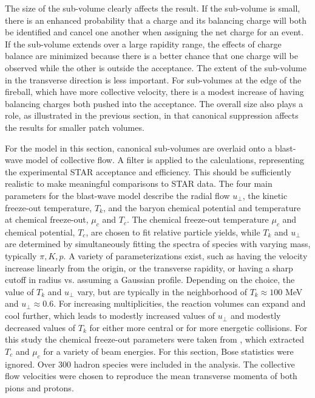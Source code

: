 The size of the sub-volume clearly affects the result. If the sub-volume is small, there is an enhanced probability that a charge and its balancing charge will both be identified and cancel one another when assigning the net charge for an event. If the sub-volume extends over a large rapidity range, the effects of charge balance are minimized because there is a better chance that one charge will be observed while the other is outside the acceptance. The extent of the sub-volume in the transverse direction is less important. For sub-volumes at the edge of the fireball, which have more collective velocity, there is a modest increase of having balancing charges both pushed into the acceptance. The overall size also plays a role, as illustrated in the previous section, in that canonical suppression affects the results for smaller patch volumes. 

For the model in this section, canonical sub-volumes are overlaid onto a blast-wave model of collective flow. A filter is applied to the calculations, representing the experimental STAR acceptance and efficiency. This should be sufficiently realistic to make meaningful comparisons to STAR data. The four main parameters for the blast-wave model describe the radial flow $u_\perp$, the kinetic freeze-out temperature, $T_k$, and the baryon chemical potential and temperature at chemical freeze-out, $\mu_c$ and $T_c$. The chemical freeze-out temperature $\mu_c$ and chemical potential, $T_c$, are chosen to fit relative particle yields, while $T_k$ and $u_\perp$ are determined by simultaneously fitting the spectra of species with varying mass, typically $\pi,K,p$. A variety of parameterizations exist, such as having the velocity increase linearly from the origin, or the transverse rapidity, or having a sharp cutoff in radius vs. assuming a Gaussian profile. Depending on the choice, the value of $T_k$ and $u_\perp$ vary, but are typically in the neighborhood of $T_k\approx 100$ MeV and $u_\perp\approx 0.6$. For increasing multiplicities, the reaction volumes can expand and cool further, which leads to modestly increased values of $u_\perp$ and modestly decreased values of $T_k$ for either more central or for more energetic collisions. For this study the chemical freeze-out parameters were taken from \cite{Das:2012yq,Kumar:2012np}, which extracted $T_c$ and $\mu_c$ for a variety of beam energies. For this section, Bose statistics were ignored. Over 300 hadron species were included in the analysis. The collective flow velocities were chosen to reproduce the mean transverse momenta of both pions and protons.

